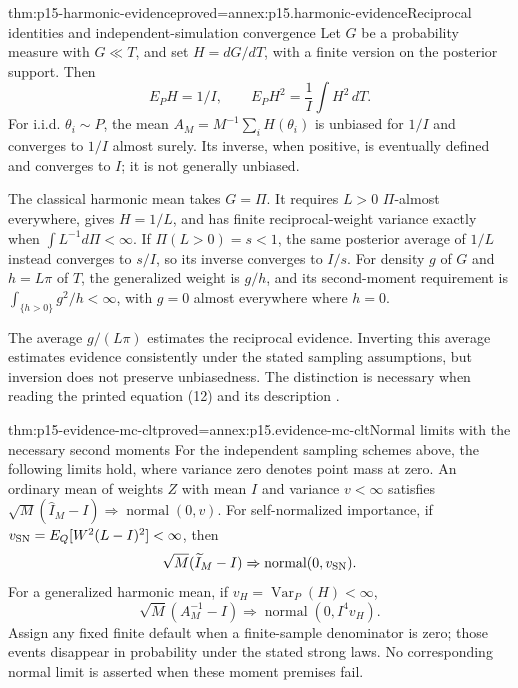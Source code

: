 \begin{hbtheorem}{thm:p15-harmonic-evidence}{proved=annex:p15.harmonic-evidence}{Reciprocal identities and independent-simulation convergence}
Let \(G\) be a probability measure with \(G\ll T\), and set
\(H=dG/dT\), with a finite version on the posterior support. Then
\[
 E_P H=1/I,\qquad
 E_P H^2=\frac1I\int H^2\,dT.
\]
For i.i.d. \(\theta_i\sim P\), the mean
\(A_M=M^{-1}\sum_iH(\theta_i)\) is unbiased for \(1/I\) and
converges to \(1/I\) almost surely. Its inverse, when positive, is
eventually defined and converges to \(I\); it is not generally unbiased.

The classical harmonic mean takes \(G=\Pi\). It requires
\(L>0\) \(\Pi\)-almost everywhere, gives \(H=1/L\), and has finite
reciprocal-weight variance exactly when \(\int L^{-1}d\Pi<\infty\).
If \(\Pi(L>0)=s<1\), the same posterior average of \(1/L\) instead
converges to \(s/I\), so its inverse converges to \(I/s\).
For density \(g\) of \(G\) and \(h=L\pi\) of \(T\),
the generalized weight is \(g/h\), and its second-moment requirement
is \(\int_{\{h>0\}}g^2/h<\infty\), with \(g=0\) almost everywhere
where \(h=0\).
\end{hbtheorem}

The average \(g/(L\pi)\) estimates the reciprocal evidence. Inverting
this average estimates evidence consistently under the stated sampling
assumptions, but inversion does not preserve unbiasedness. The distinction
is necessary when reading the printed equation (12) and its description
\cite[Sec.~4.3]{KassRaftery1995BayesFactors}.

\begin{hbtheorem}{thm:p15-evidence-mc-clt}{proved=annex:p15.evidence-mc-clt}{Normal limits with the necessary second moments}
For the independent sampling schemes above, the following limits hold,
where variance zero denotes point mass at zero.
An ordinary mean of weights \(Z\) with mean \(I\) and variance
\(v<\infty\) satisfies
\(\sqrt M(\widehat I_M-I)\Rightarrow\operatorname{normal}(0,v)\).
For self-normalized importance, if
\(v_{\rm SN}=E_Q[W^2(L-I)^2]<\infty\), then
\[
 \sqrt M(\widetilde I_M-I)\Rightarrow\operatorname{normal}(0,v_{\rm SN}).
\]
For a generalized harmonic mean, if \(v_H=\operatorname{Var}_P(H)<\infty\),
\[
 \sqrt M(A_M^{-1}-I)\Rightarrow\operatorname{normal}(0,I^4v_H).
\]
Assign any fixed finite default when a finite-sample denominator is zero;
those events disappear in probability under the stated strong laws.
No corresponding normal limit is asserted when these moment premises fail.
\end{hbtheorem}

